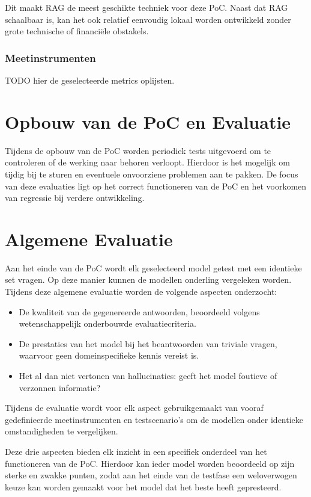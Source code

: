 Dit maakt RAG de meest geschikte techniek voor deze PoC. Naast dat RAG schaalbaar is, kan het ook relatief eenvoudig lokaal worden ontwikkeld zonder grote technische of financiële obstakels.

\subsubsection{Meetinstrumenten}

TODO hier de geselecteerde metrics oplijsten.

\section{Opbouw van de PoC en Evaluatie}

Tijdens de opbouw van de PoC worden periodiek tests uitgevoerd om te controleren of de werking naar behoren verloopt. Hierdoor is het mogelijk om tijdig bij te sturen en eventuele onvoorziene problemen aan te pakken. De focus van deze evaluaties ligt op het correct functioneren van de PoC en het voorkomen van regressie bij verdere ontwikkeling.

\section{Algemene Evaluatie}

Aan het einde van de PoC wordt elk geselecteerd model getest met een identieke set vragen. Op deze manier kunnen de modellen onderling vergeleken worden. Tijdens deze algemene evaluatie worden de volgende aspecten onderzocht:

\begin{itemize}
    \item De kwaliteit van de gegenereerde antwoorden, beoordeeld volgens wetenschappelijk onderbouwde evaluatiecriteria.
    \item De prestaties van het model bij het beantwoorden van triviale vragen, waarvoor geen domeinspecifieke kennis vereist is.
    \item Het al dan niet vertonen van hallucinaties: geeft het model foutieve of verzonnen informatie?
\end{itemize}


Tijdens de evaluatie wordt voor elk aspect gebruikgemaakt van vooraf gedefinieerde meetinstrumenten en testscenario’s om de modellen onder identieke omstandigheden te vergelijken.

Deze drie aspecten bieden elk inzicht in een specifiek onderdeel van het functioneren van de PoC. Hierdoor kan ieder model worden beoordeeld op zijn sterke en zwakke punten, zodat aan het einde van de testfase een weloverwogen keuze kan worden gemaakt voor het model dat het beste heeft gepresteerd.

